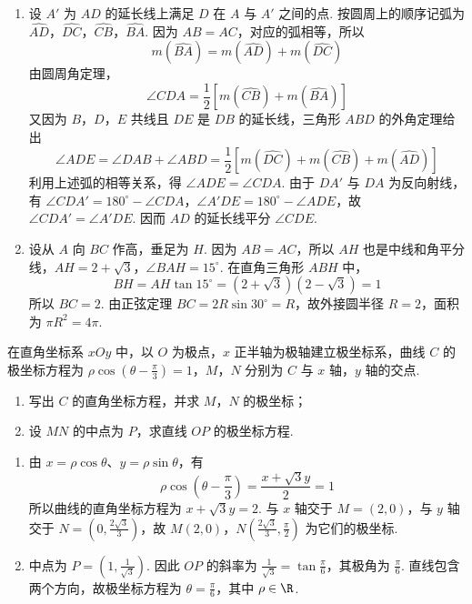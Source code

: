 \begin{solution}
\begin{enumerate}
\item 设 \(A'\) 为 \(AD\) 的延长线上满足 \(D\) 在 \(A\) 与 \(A'\) 之间的点. 按圆周上的顺序记弧为 \(\widehat{AD}\)，\(\widehat{DC}\)，\(\widehat{CB}\)，\(\widehat{BA}\). 因为 \(AB=AC\)，对应的弧相等，所以
\[
m(\widehat{BA})=m(\widehat{AD})+m(\widehat{DC})
\]
由圆周角定理，
\[
\angle CDA=\frac12\left[m(\widehat{CB})+m(\widehat{BA})\right]
\]
又因为 \(B\)，\(D\)，\(E\) 共线且 \(DE\) 是 \(DB\) 的延长线，三角形 \(ABD\) 的外角定理给出
\[
\angle ADE=\angle DAB+\angle ABD=\frac12\left[m(\widehat{DC})+m(\widehat{CB})+m(\widehat{AD})\right]
\]
利用上述弧的相等关系，得 \(\angle ADE=\angle CDA\). 由于 \(DA'\) 与 \(DA\) 为反向射线，有 \(\angle CDA'=180^{\circ}-\angle CDA\)，\(\angle A'DE=180^{\circ}-\angle ADE\)，故 \(\angle CDA'=\angle A'DE\). 因而 \(AD\) 的延长线平分 \(\angle CDE\).
\item 设从 \(A\) 向 \(BC\) 作高，垂足为 \(H\). 因为 \(AB=AC\)，所以 \(AH\) 也是中线和角平分线，\(AH=2+\sqrt3\)，\(\angle BAH=15^{\circ}\). 在直角三角形 \(ABH\) 中，
\[
BH=AH\tan15^{\circ}=(2+\sqrt3)(2-\sqrt3)=1
\]
所以 \(BC=2\). 由正弦定理 \(BC=2R\sin30^{\circ}=R\)，故外接圆半径 \(R=2\)，面积为 \(\pi R^2=4\pi\).
\end{enumerate}
\end{solution}

\begin{problem}
在直角坐标系 \(xOy\) 中，以 \(O\) 为极点，\(x\) 正半轴为极轴建立极坐标系，曲线 \(C\) 的极坐标方程为 \(\rho \cos \left(\theta - \frac{\pi}{3}\right) = 1\)，\(M\)，\(N\) 分别为 \(C\) 与 \(x\) 轴，\(y\) 轴的交点.
\begin{enumerate}
\item 写出 \(C\) 的直角坐标方程，并求 \(M\)，\(N\) 的极坐标；
\item 设 \(MN\) 的中点为 \(P\)，求直线 \(OP\) 的极坐标方程.
\end{enumerate}
\end{problem}

\begin{solution}
\begin{enumerate}
\item 由 \(x=\rho\cos\theta\)、\(y=\rho\sin\theta\)，有
\[
\rho\cos\left(\theta-\frac\pi3\right)=\frac{x+\sqrt3y}{2}=1
\]
所以曲线的直角坐标方程为 \(x+\sqrt3y=2\). 与 \(x\) 轴交于 \(M=(2,0)\)，与 \(y\) 轴交于 \(N=\left(0,\frac{2\sqrt3}{3}\right)\)，故
\(M\left(2,0\right)\)，\(N\left(\frac{2\sqrt3}{3},\frac\pi2\right)\) 为它们的极坐标.
\item 中点为 \(P=\left(1,\frac1{\sqrt3}\right)\). 因此 \(OP\) 的斜率为 \(\frac1{\sqrt3}=\tan\frac\pi6\)，其极角为 \(\frac\pi6\). 直线包含两个方向，故极坐标方程为 \(\theta=\frac\pi6\)，其中 \(\rho\in\R\).
\end{enumerate}
\end{solution}


